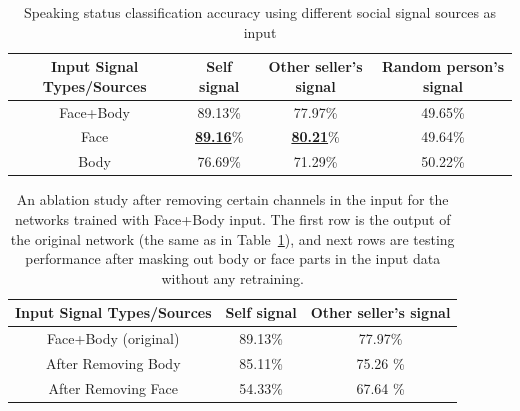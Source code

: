 \begin{table}[t]
	\centering
	\begin{tabular}{c| c| c| c}
		\hline
		Input Signal Types/Sources & Self signal & Other seller's signal & Random person's signal\\
		\hline
		Face+Body & 89.13\% & 77.97\% & 49.65\%\\       %
		\hline
		Face & \underline {\textbf{89.16}}\% & \underline {\textbf{80.21}}\% & 49.64\%\\       %
		\hline
		Body & 76.69\% & 71.29\% & 50.22\%\\       %
		\hline
	\end{tabular}
	\caption{Speaking status classification accuracy using different social signal sources as input\label{table:speaking_class}}
\end{table}
\begin{table}[t]
	\centering
	\begin{tabular}{c| c| c }
		\hline
		Input Signal Types/Sources & Self signal & Other seller's signal \\
		\hline
		Face+Body (original) & 89.13\% & 77.97\% \\       %
		\hline
		After Removing Body & 85.11\% & 75.26 \% \\       %
		\hline
		After Removing Face & 54.33\% & 67.64 \% \\       %
		\hline
	\end{tabular}
	\caption{An ablation study after removing certain channels in the input for the networks trained with Face+Body input. The first row is the output of the original network (the same as in Table~\ref{table:speaking_class}), and next rows are testing performance after masking out body or face parts in the input data without any retraining. \label{table:speaking_class_ablation}}
\end{table}
